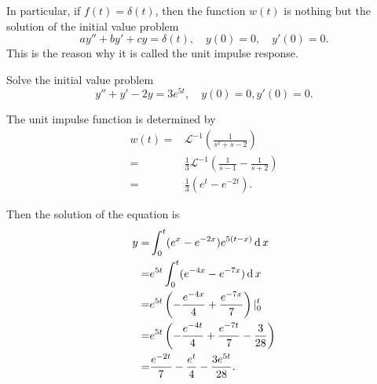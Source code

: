 In particular, if $f(t)=\delta(t)$, then the function $w(t)$ is nothing but the solution of the initial value problem
\[ay''+by'+cy=\delta(t), \quad y(0)=0, \quad y'(0)=0.\]
This is the reason why it is called the unit impulse response.

\begin{example}
  Solve the initial value problem
  \[y''+y'-2y=3e^{5t},\quad y(0)=0, y'(0)=0.\]
\end{example}
\begin{solution}
  The unit impulse function is determined by
  \[
    \begin{aligned}
      w(t)=&\mathcal{L}^{-1}\left(\frac{1}{s^2+s-2}\right)\\
      =&\frac13\mathcal{L}^{-1}\left(\frac{1}{s-1}-\frac{1}{s+2}\right)\\
      =&\frac13(e^{t}-e^{-2t}).
    \end{aligned}
    \]

  Then the solution of the equation is
  \[
  \begin{aligned}
    y=&\int_0^t(e^{x}-e^{-2x})e^{5(t-x)}\operatorname{d} x\\
    =&e^{5t}\int_0^t (e^{-4x}-e^{-7x})\operatorname{d} x\\
    =&e^{5t}\left(-\frac{e^{-4x}}{4}+\frac{e^{-7x}}{7}\right)|_0^t\\
    =&e^{5t}\left(-\frac{e^{-4t}}{4}+\frac{e^{-7t}}{7}-\frac{3}{28}\right)\\
    =&\frac{e^{-2t}}{7}-\frac{e^{t}}{4}-\frac{3e^{5t}}{28}.
  \end{aligned}  
  \]
\end{solution}

